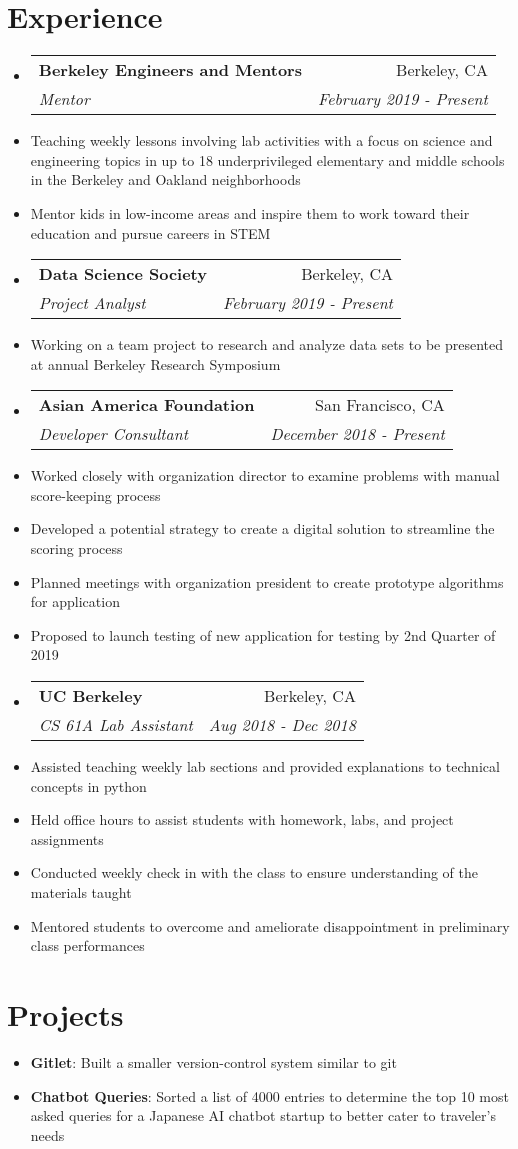 \documentclass[letterpaper,11pt]{article}
\makeatletter
\newcommand{\resumeItem}[2]{
  \item\small{
    \textbf{#1}{: #2 \vspace{-2pt}}
  }
}
\newcommand{\resumeSubheading}[4]{
  \vspace{-1pt}\item[]
  \begin{tabular*}{0.98\textwidth}{l@{\extracolsep{\fill}}r}
      \hspace{-10pt}\textbf{#1} & #2 \\
      \hspace{-10pt}\textit{\small#3} & \textit{\small #4} \\
    \end{tabular*}\vspace{-5pt}
}
\newcommand{\resumeSubItem}[2]{\resumeItem{#1}{#2}\vspace{-4pt}}
\newcommand{\resumeSubHeadingListStart}{\begin{itemize}[leftmargin=*]}
\newcommand{\resumeSubHeadingListEnd}{\end{itemize}}
\newcommand{\shorterSection}[1]{\vspace{-10pt}\section{#1}}
\makeatother
\begin{document}
\vspace{-.25pt}
\shorterSection{Experience}
  \resumeSubHeadingListStart
    \resumeSubheading
      {Berkeley Engineers and Mentors}{Berkeley, CA}
      {Mentor}{February 2019 - Present}
        \item Teaching weekly lessons involving lab activities with a focus on science and engineering topics in up to 18 underprivileged elementary and middle schools in the Berkeley and Oakland neighborhoods
        \item Mentor kids in low-income areas and inspire them to work toward their education and pursue careers in STEM
    \resumeSubheading
      {Data Science Society}{Berkeley, CA}
      {Project Analyst}{February 2019 - Present}
      \setlength\itemsep{.25em}
      \item Working on a team project to research and analyze data sets to be presented at annual Berkeley Research Symposium
    \resumeSubheading
      {Asian America Foundation}{San Francisco, CA}
      {Developer Consultant}{December 2018 - Present}
      \setlength\itemsep{.25em}
      \item Worked closely with organization director to examine problems with manual score-keeping process
      \item Developed a potential strategy to create a digital solution to streamline the scoring process
      \item Planned meetings with organization president to create prototype algorithms for application
      \item Proposed to launch testing of new application for testing by 2nd Quarter of 2019
    \resumeSubheading
      {UC Berkeley}{Berkeley, CA}
      {CS 61A Lab Assistant}{Aug 2018 - Dec 2018}
      \setlength\itemsep{.25em}
      \item Assisted teaching weekly lab sections and provided explanations to technical concepts in python
      \item Held office hours to assist students with homework, labs, and project assignments
      \item Conducted weekly check in with the class to ensure understanding of the materials taught
      \item Mentored students to overcome and ameliorate disappointment in preliminary class performances
  \resumeSubHeadingListEnd    
 

\shorterSection{Projects}
  \resumeSubHeadingListStart
    \resumeSubItem{Gitlet}
     {Built a smaller version-control system similar to git}
     \resumeSubItem{Chatbot Queries}
     {Sorted a list of 4000 entries to determine the top 10 most asked queries for a Japanese AI chatbot startup to better cater to traveler's needs}
  \resumeSubHeadingListEnd
\end{document}
